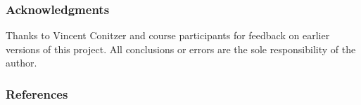 \documentclass[12pt,letterpaper]{article} %
\begin{document}
\subsubsection*{Acknowledgments}

Thanks to Vincent Conitzer and course participants for feedback on earlier versions of this project. All conclusions or errors are the sole responsibility of the author.

\subsubsection*{References}



\begingroup
\renewcommand{\section}[2]{}


\endgroup
\end{document}
